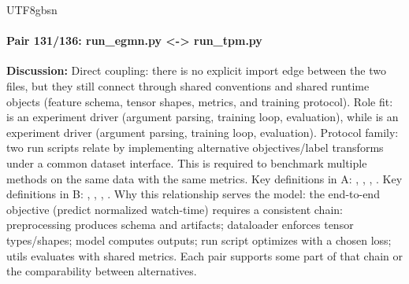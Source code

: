 \documentclass[11pt]{article}
\begin{document}
\begin{CJK*}{UTF8}{gbsn}
\paragraph{Pair 131/136: run\_egmn.py <-> run\_tpm.py}
\textbf{Discussion:} Direct coupling: there is no explicit import edge between the two files, but they still connect through shared conventions and shared runtime objects (feature schema, tensor shapes, metrics, and training protocol). Role fit: \texttt{} is an experiment driver (argument parsing, training loop, evaluation), while \texttt{} is an experiment driver (argument parsing, training loop, evaluation). Protocol family: two run scripts relate by implementing alternative objectives/label transforms under a common dataset interface. This is required to benchmark multiple methods on the same data with the same metrics. Key definitions in A: \texttt{}, \texttt{}, \texttt{}, \texttt{}. Key definitions in B: \texttt{}, \texttt{}, \texttt{}, \texttt{}. Why this relationship serves the model: the end-to-end objective (predict normalized watch-time) requires a consistent chain: preprocessing produces schema and artifacts; dataloader enforces tensor types/shapes; model computes outputs; run script optimizes with a chosen loss; utils evaluates with shared metrics. Each pair supports some part of that chain or the comparability between alternatives.


\end{CJK*}
\end{document}
